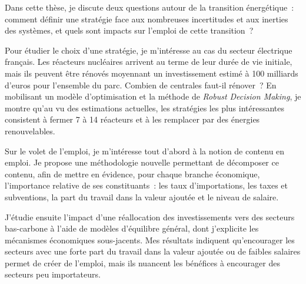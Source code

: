 Dans cette thèse, je discute deux questions autour de la transition énergétique : comment définir une stratégie face aux nombreuses incertitudes et aux inerties des systèmes, et quels sont impacts sur l’emploi de cette transition ?

Pour étudier le choix d’une stratégie, je m’intéresse au cas du secteur électrique français. Les réacteurs nucléaires arrivent au terme de leur durée de vie initiale, mais ils peuvent être rénovés moyennant un investissement estimé à 100 milliards d'euros pour l'ensemble du parc. Combien de centrales faut-il rénover ? En mobilisant un modèle d'optimisation et la méthode de \textit{Robust Decision Making}, je montre qu’au vu des estimations actuelles, les stratégies les plus intéressantes consistent à fermer 7 à 14 réacteurs et à les remplacer par des énergies renouvelables.

Sur le volet de l’emploi, je m’intéresse tout d’abord à la notion de contenu en emploi. Je propose une méthodologie nouvelle permettant de décomposer ce contenu, afin de mettre en évidence, pour chaque branche économique, l’importance relative de ses constituants : les taux d’importations, les taxes et subventions, la part du travail dans la valeur ajoutée et le niveau de salaire. 

J'étudie ensuite l’impact d’une réallocation des investissements vers des secteurs bas-carbone à l'aide de modèles d'équilibre général, dont j'explicite les mécanismes économiques sous-jacents.
Mes résultats indiquent qu'encourager les secteurs avec une forte part du travail dans la valeur ajoutée ou de faibles salaires permet de créer de l'emploi, mais ils nuancent les bénéfices à encourager des secteurs peu importateurs.
